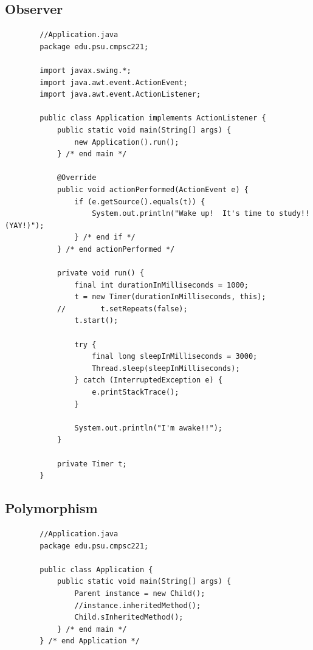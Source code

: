\documentclass[a4paper, 11pt]{article}
\begin{document}
    \newpage

    \subsection{Observer}
        \begin{lstlisting}
        //Application.java
        package edu.psu.cmpsc221;

        import javax.swing.*;
        import java.awt.event.ActionEvent;
        import java.awt.event.ActionListener;

        public class Application implements ActionListener {
            public static void main(String[] args) {
                new Application().run();
            } /* end main */

            @Override
            public void actionPerformed(ActionEvent e) {
                if (e.getSource().equals(t)) {
                    System.out.println("Wake up!  It's time to study!! (YAY!)");
                } /* end if */
            } /* end actionPerformed */

            private void run() {
                final int durationInMilliseconds = 1000;
                t = new Timer(durationInMilliseconds, this);
            //        t.setRepeats(false);
                t.start();

                try {
                    final long sleepInMilliseconds = 3000;
                    Thread.sleep(sleepInMilliseconds);
                } catch (InterruptedException e) {
                    e.printStackTrace();
                }

                System.out.println("I'm awake!!");
            }

            private Timer t;
        }
        \end{lstlisting}

    \newpage

    \subsection{Polymorphism}
        \begin{lstlisting}
        //Application.java
        package edu.psu.cmpsc221;

        public class Application {
            public static void main(String[] args) {
                Parent instance = new Child();
                //instance.inheritedMethod();
                Child.sInheritedMethod();
            } /* end main */
        } /* end Application */
        \end{lstlisting}
\end{document}
